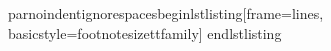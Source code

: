 \markdownRendererDocumentBegin
\markdownRendererBackslash{}par\markdownRendererBackslash{}noindent\markdownRendererBackslash{}ignorespaces\markdownRendererBackslash{}begin\markdownRendererLeftBrace{}lstlisting\markdownRendererRightBrace{}[frame=lines, basicstyle=\markdownRendererBackslash{}footnotesize\markdownRendererBackslash{}ttfamily]\markdownRendererInterblockSeparator
{}\markdownRendererSectionBegin
{}\markdownRendererInterblockSeparator
{}
\markdownRendererSectionEnd \markdownRendererSectionBegin
{}\markdownRendererInterblockSeparator
{}\markdownRendererBackslash{}end\markdownRendererLeftBrace{}lstlisting\markdownRendererRightBrace{}
\markdownRendererSectionEnd \markdownRendererDocumentEnd